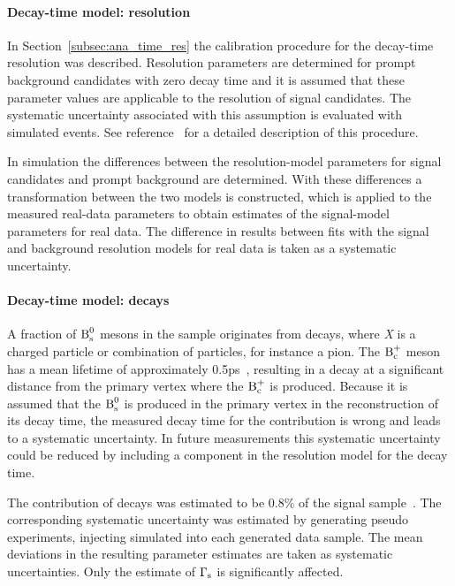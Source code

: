 \paragraph{Decay-time model: resolution}
In Section~\ref{subsec:ana_time_res} the calibration procedure for the decay-time resolution was described. Resolution parameters are
determined for prompt background candidates with zero decay time and it is assumed that these parameter values are applicable to the
resolution of signal candidates. The systematic uncertainty associated with this assumption is evaluated with simulated events. See
reference~\cite{Aaij:2014} for a detailed description of this procedure.

In simulation the differences between the resolution-model parameters for signal candidates and prompt background are determined. With
these differences a transformation between the two models is constructed, which is applied to the measured real-data parameters to obtain
estimates of the signal-model parameters for real data. The difference in results between fits with the signal and background
resolution models for real data is taken as a systematic uncertainty.

\paragraph{Decay-time model: \BctoBsX{} decays}
A fraction of $\text{B}_\text{s}^\text{0}$ mesons in the \BstoJpsiKK{} sample originates from \BctoBsX{} decays, where \textit{X} is a charged particle or
combination of particles, for instance a pion. The $\text{B}_\text{c}^\text{+}$ meson has a mean lifetime of approximately 0.5\unitsp{}ps~\cite{PDG}, resulting in
a decay at a significant distance from the primary vertex where the $\text{B}_\text{c}^\text{+}$ is produced. Because it is assumed that the $\text{B}_\text{s}^\text{0}$ is produced in
the primary vertex in the reconstruction of its decay time, the measured decay time for the \BctoBsX{} contribution is wrong and leads to a
systematic uncertainty. In future measurements this systematic uncertainty could be reduced by including a \BctoBsX{} component in the
resolution model for the decay time.

The contribution of \BctoBsX{} decays was estimated to be 0.8\% of the \BstoJpsiKK{} signal sample~\cite{LHCb-ANA-2014-039}. The
corresponding systematic uncertainty was estimated by generating pseudo experiments, injecting simulated \BctoBsJpsiKKX{} into each
generated data sample. The mean deviations in the resulting parameter estimates are taken as systematic uncertainties. Only the estimate of
$\Gamma_\text{s}$ is significantly affected.

